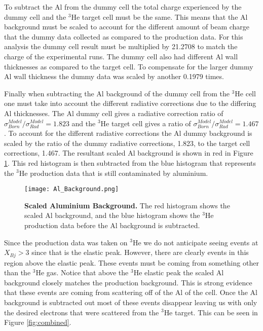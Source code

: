 To subtract the Al from the dummy cell the total charge experienced by the dummy cell and the $^3$He target cell must be the same. This means that the Al background must be scaled to account for the different amount of beam charge that the dummy data collected as compared to the production data. For this analysis the dummy cell result must be multiplied by 21.2708 to match the charge of the experimental runs. The dummy cell also had different Al wall thicknesses as compared to the target cell. To compensate for the larger dummy Al wall thickness the dummy data was scaled by another 0.1979 times.

Finally when subtracting the Al background of the dummy cell from the $^3$He cell one must take into account the different radiative corrections due to the differing Al thicknesses. The Al dummy cell gives a radiative correction ratio of $\sigma^{Model}_{Born}/\sigma^{Model}_{Rad} = 1.823$ and the $^3$He target cell gives a ratio of $\sigma^{Model}_{Born}/\sigma^{Model}_{Rad} = 1.467$. To account for the different radiative corrections the Al dummy background is scaled by the ratio of the dummy radiative corrections, 1.823, to the target cell corrections, 1.467. The resultant scaled Al background is shown in red in Figure \ref{fig:al}. This red histogram is then subtracted from the blue histogram that represents the $^3$He production data that is still contaminated by aluminium. 

\begin{figure}[!ht]
\begin{center}
\texttt{[image: Al\_Background.png]}
\end{center}
\caption[Scaled Aluminium Background]{
{\bf{Scaled Aluminium Background.}} The red histogram shows the scaled Al background, and the blue histogram shows the $^3$He production data before the Al background is subtracted.}
\label{fig:al}
\end{figure}

Since the production data was taken on $^3$He we do not anticipate seeing events at $X_{Bj} > 3$ since that is the elastic peak. However, there are clearly events in this region above the elastic peak. These events must be coming from something other than the $^3$He gas. Notice that above the $^3$He elastic peak the scaled Al background closely matches the production background. This is strong evidence that these events are coming from scattering off of the Al of the cell. Once the Al background is subtracted out most of these events disappear leaving us with only the desired electrons that were scattered from the $^3$He target. This can be seen in Figure \ref{fig:combined}.


